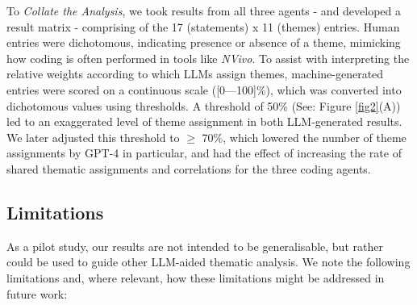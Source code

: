 \documentclass{article}
\begin{document}
To \emph{Collate the Analysis}, we took results from all three agents - and developed a result matrix - comprising of the 17 (statements) x 11 (themes) entries. Human entries were dichotomous, indicating presence or absence of a theme, mimicking how coding is often performed in tools like \emph{NVivo}. To assist with interpreting the relative weights according to which LLMs assign themes, machine-generated entries were scored on a continuous scale ([0––100]\%), which was converted into dichotomous values using thresholds. A threshold  of 50\% (See: Figure \ref{fig2}(A)) led to an exaggerated level of theme assignment in both LLM-generated results. We later adjusted this threshold to $\geq$ 70\%, which lowered the number of theme assignments by GPT-4 in particular, and had the effect of increasing the rate of shared thematic assignments and correlations for the three coding agents. 


\subsection{Limitations}\label{limitations}

As a pilot study, our results are not intended to be generalisable, but rather could be used to guide other LLM-aided thematic analysis. We note the following limitations and, where relevant, how these limitations might be addressed in future work:
\end{document}
